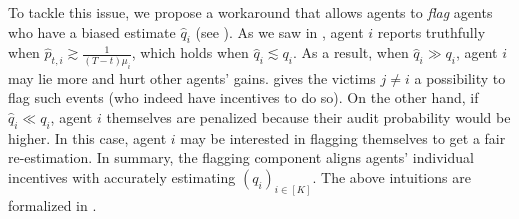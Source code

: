 To tackle this issue, we propose a workaround that allows agents to \textit{flag} agents who have a biased estimate $\hat q_i$ (see ).
As we saw in , agent $i$ reports truthfully when $\hat p_{t,i}\gtrsim \frac{1}{(T-t)\mu_i}$, which holds when $\hat q_i\lesssim q_i$.
As a result, when $\hat q_i\gg q_i$, agent $i$ may lie more and hurt other agents' gains.  gives the victims $j\ne i$ a possibility to flag such events (who indeed have incentives to do so).
On the other hand, if $\hat q_i\ll q_i$, agent $i$ themselves are penalized because their audit probability would be higher. In this case, agent $i$ may be interested in flagging themselves to get a fair re-estimation.
In summary, the flagging component aligns agents' individual incentives with accurately estimating $(q_i)_{i\in[K]}$. The above intuitions are formalized in .
